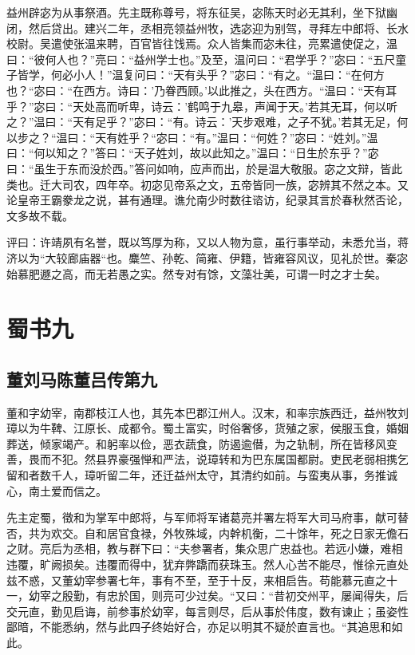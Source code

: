\documentclass[12pt,UTF8]{ctexbook}
\begin{document}
益州辟宓为从事祭酒。先主既称尊号，将东征吴，宓陈天时必无其利，坐下狱幽闭，然后贷出。建兴二年，丞相亮领益州牧，选宓迎为别驾，寻拜左中郎将、长水校尉。吴遣使张温来聘，百官皆往饯焉。众人皆集而宓未往，亮累遣使促之，温曰：“彼何人也？”亮曰：“益州学士也。”及至，温问曰：“君学乎？”宓曰：“五尺童子皆学，何必小人！”温复问曰：“天有头乎？”宓曰：“有之。“温曰：“在何方也？“宓曰：“在西方。诗曰：'乃眷西顾。'以此推之，头在西方。“温曰：“天有耳乎？”宓曰：“天处高而听卑，诗云：'鹤鸣于九皋，声闻于天。'若其无耳，何以听之？”温曰：“天有足乎？”宓曰：“有。诗云：'天步艰难，之子不犹。'若其无足，何以步之？“温曰：“天有姓乎？“宓曰：“有。”温曰：“何姓？”宓曰：“姓刘。”温曰：“何以知之？”答曰：“天子姓刘，故以此知之。”温曰：“日生於东乎？”宓曰：“虽生于东而没於西。”答问如响，应声而出，於是温大敬服。宓之文辩，皆此类也。迁大司农，四年卒。初宓见帝系之文，五帝皆同一族，宓辨其不然之本。又论皇帝王霸豢龙之说，甚有通理。谯允南少时数往谘访，纪录其言於春秋然否论，文多故不载。

评曰：许靖夙有名誉，既以笃厚为称，又以人物为意，虽行事举动，未悉允当，蒋济以为“大较廊庙器“也。麋竺、孙乾、简雍、伊籍，皆雍容风议，见礼於世。秦宓始慕肥遯之高，而无若愚之实。然专对有馀，文藻壮美，可谓一时之才士矣。

\part{蜀书九}
\chapter{董刘马陈董吕传第九}

董和字幼宰，南郡枝江人也，其先本巴郡江州人。汉末，和率宗族西迁，益州牧刘璋以为牛鞞、江原长、成都令。蜀土富实，时俗奢侈，货殖之家，侯服玉食，婚姻葬送，倾家竭产。和躬率以俭，恶衣蔬食，防遏逾僣，为之轨制，所在皆移风变善，畏而不犯。然县界豪强惮和严法，说璋转和为巴东属国都尉。吏民老弱相携乞留和者数千人，璋听留二年，还迁益州太守，其清约如前。与蛮夷从事，务推诚心，南土爱而信之。

先主定蜀，徵和为掌军中郎将，与军师将军诸葛亮并署左将军大司马府事，献可替否，共为欢交。自和居官食禄，外牧殊域，内幹机衡，二十馀年，死之日家无儋石之财。亮后为丞相，教与群下曰：“夫参署者，集众思广忠益也。若远小嫌，难相违覆，旷阙损矣。违覆而得中，犹弃弊蹻而获珠玉。然人心苦不能尽，惟徐元直处兹不惑，又董幼宰参署七年，事有不至，至于十反，来相启告。苟能慕元直之十一，幼宰之殷勤，有忠於国，则亮可少过矣。“又曰：“昔初交州平，屡闻得失，后交元直，勤见启诲，前参事於幼宰，每言则尽，后从事於伟度，数有谏止；虽姿性鄙暗，不能悉纳，然与此四子终始好合，亦足以明其不疑於直言也。“其追思和如此。
\end{document}
